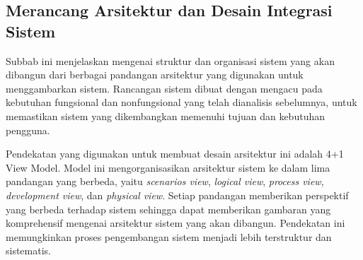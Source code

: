 \subsection{Merancang Arsitektur dan Desain Integrasi Sistem}
\label{subsec:merancang-aristektur-dan-desain-integrasi-sistem}

Subbab ini menjelaskan mengenai struktur dan organisasi sistem yang akan dibangun dari berbagai pandangan arsitektur yang digunakan untuk menggambarkan sistem. Rancangan sistem dibuat dengan mengacu pada kebutuhan fungsional dan nonfungsional yang telah 
dianalisis sebelumnya, untuk memastikan sistem yang dikembangkan memenuhi tujuan dan kebutuhan pengguna.

Pendekatan yang digunakan untuk membuat desain arsitektur ini adalah 4+1 View Model. Model ini mengorganisasikan arsitektur sistem ke dalam lima pandangan yang berbeda, yaitu \emph{scenarios view}, \emph{logical view}, \emph{process view}, \emph{development view}, dan \emph{physical view}. Setiap pandangan memberikan perspektif yang berbeda terhadap sistem sehingga dapat memberikan gambaran yang komprehensif mengenai arsitektur sistem yang akan dibangun. Pendekatan ini memungkinkan proses pengembangan sistem menjadi lebih terstruktur dan sistematis.










